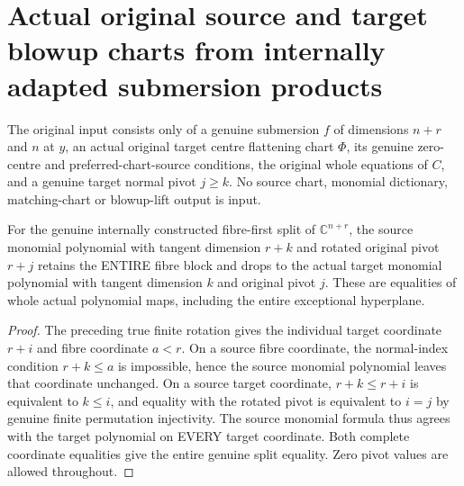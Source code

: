 \section{Actual original source and target blowup charts from internally adapted submersion products}
The original input consists only of a genuine submersion $f$ of dimensions $n+r$ and $n$ at $y$, an actual original target centre flattening chart $\Phi$, its genuine zero-centre and preferred-chart-source conditions, the original whole equations of $C$, and a genuine target normal pivot $j\geq k$. No source chart, monomial dictionary, matching-chart or blowup-lift output is input.

\begin{lemma}
\label{hir:submersion-adapted-blowup-entire-monomial-dictionary}
\leanok
{}

For the genuine internally constructed fibre-first split of $\mathbb C^{n+r}$, the source monomial polynomial with tangent dimension $r+k$ and rotated original pivot $r+j$ retains the ENTIRE fibre block and drops to the actual target monomial polynomial with tangent dimension $k$ and original pivot $j$. These are equalities of whole actual polynomial maps, including the entire exceptional hyperplane.
\end{lemma}
\begin{proof}
The preceding true finite rotation gives the individual target coordinate $r+i$ and fibre coordinate $a<r$. On a source fibre coordinate, the normal-index condition $r+k\leq a$ is impossible, hence the source monomial polynomial leaves that coordinate unchanged. On a source target coordinate, $r+k\leq r+i$ is equivalent to $k\leq i$, and equality with the rotated pivot is equivalent to $i=j$ by genuine finite permutation injectivity. The source monomial formula thus agrees with the target polynomial on EVERY target coordinate. Both complete coordinate equalities give the entire genuine split equality. Zero pivot values are allowed throughout.
\end{proof}

